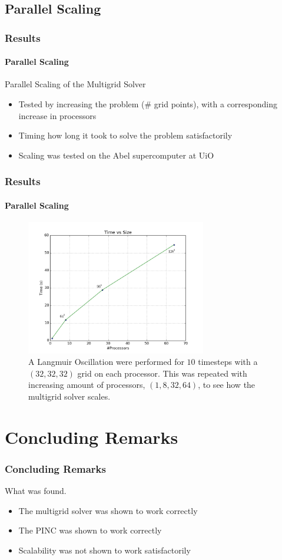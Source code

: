 \documentclass{beamer}
\begin{document}
\subsection{Parallel Scaling}
\begin{frame}
	\frametitle{Results}
	\framesubtitle{Parallel Scaling}
	Parallel Scaling of the Multigrid Solver
	\begin{itemize}
		\item Tested by increasing the problem (\# grid points), with a corresponding increase in processors
		\item Timing how long it took to solve the problem satisfactorily
		\item Scaling was tested on the Abel supercomputer at UiO
	\end{itemize}
\end{frame}

\begin{frame}
	\frametitle{Results}
	\framesubtitle{Parallel Scaling}
	\begin{figure}
		\label{fig:scalingMG}
		\includegraphics[width = 0.7\textwidth]{figures/scalingMG}
		\caption{A Langmuir Oscillation were performed for \(10\) timesteps with a \((32,32,32)\) grid on each processor.
		This was repeated with increasing amount of processors, \((1, 8, 32, 64)\), to see how the multigrid solver scales.}
	\end{figure}
\end{frame}

\section{Concluding Remarks}
\begin{frame}
\frametitle{Concluding Remarks}
What was found.
	\begin{itemize}
		\item The multigrid solver was shown to work correctly
		\item The PINC was shown to work correctly
		\item Scalability was not shown to work satisfactorily
	\end{itemize}
\end{frame}
\end{document}
